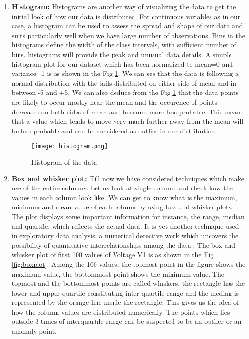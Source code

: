\begin{enumerate}
\begin{enumerate}
\item\textbf{Histogram:} Histograms are another way of visualizing the data to get the initial look of how our data is distributed. For continuous variables as in our case, a histogram can be used to assess the spread and shape of our data and suits particularly well when we have large number of observations. Bins in the histograms define the width of the class intervals, with sufficient number of bins, histograms will provide the peak and unusual data details. A simple histogram plot for our dataset which has been normalized to mean=0 and variance=1 is as shown in the Fig \ref{fig:hist1}. We can see that the data is following a normal distribution with the tails distributed on either side of mean and in between -5 and +5. We can also deduce from the Fig \ref{fig:hist1} that the data points are likely to occur mostly near the mean and the occurence of points decreases on both sides of mean and becomes more less probable. This means that a value which tends to move very much further away from the mean will be less probable and can be considered as outlier in our distribution. 
\begin{figure}[tph!]
\centerline{\texttt{[image: histogram.png]}}
\caption{Histogram of the data}
\label{fig:hist1}
\end{figure}
\item\textbf{Box and whisker plot:} Till now we have considered techniques which make use of the entire columns. Let us look at single column and check how the values in each column look like. We can get to know what is the maximum, minimum and mean value of each column by using box and whisker plots. The plot displays some important information for instance, the range, median and quartile, which reflects the actual data. It is yet another technique used in exploratory data analysis, a numerical detective work which uncovers the possibility of quantitative interrelationships among the data \cite{larsen1985box}. The box and whisker plot of first 100 values of Voltage V1 is as shown in the Fig \ref{fig:boxplot}. Among the 100 values, the topmost point in the figure shows the maximum value, the bottommost point shows the minimum value. The topmost and the bottommost points are called whiskers, the rectangle has the lower and upper quartile constituting inter-quartile range and the median is represented by the orange line inside the rectangle. This gives us the idea of how the column values are distributed numerically. The points  which lies outside 3 times of interquartile range can be suspected to be an outlier or an anomaly point.

\end{enumerate}
\end{enumerate}
